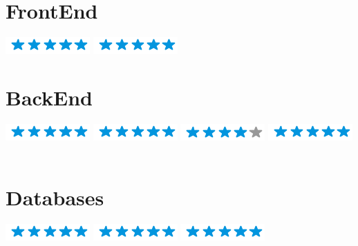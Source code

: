 \documentclass[american]{cv-class}
\begin{document}
\begin{aside}
	\section{FrontEnd}
	{\includegraphics[scale=0.40]{img/stars/5stars.png}}
	{\includegraphics[scale=0.40]{img/stars/5stars.png}}
	~
	\section{BackEnd}
	{\includegraphics[scale=0.40]{img/stars/5stars.png}}
	{\includegraphics[scale=0.40]{img/stars/5stars.png}}
	{\includegraphics[scale=0.40]{img/stars/4stars.png}}
	{\includegraphics[scale=0.40]{img/stars/5stars.png}}
	~
	\section{Databases}
	{\includegraphics[scale=0.40]{img/stars/5stars.png}}
	{\includegraphics[scale=0.40]{img/stars/5stars.png}}
	{\includegraphics[scale=0.40]{img/stars/5stars.png}}
	
\end{aside}
\end{document}
